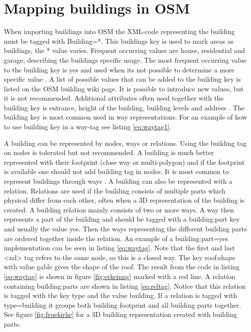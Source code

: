  \section{Mapping buildings in OSM}\label{buildOSM}
When importing buildings into OSM the XML-code representing the building must be tagged with Building=*. This buildings key is used to mark areas as buildings, the * value varies. Frequent occurring values are house, residential and garage, describing the buildings specific usage. The most frequent occurring value to the building key is yes and used when its not possible to determine a more specific value \cite{OpenStreetMapf}. A list of possible values that can be added to the building key is listed on the OSM building wiki page. It is possible to introduce new values, but it is not recommended. Additional attributes often used together with the building key is entrance, height of the building, building levels and address \cite{Unkn} . The building key is most common used in way representations. For an example of how to use building key in a way-tag see listing \ref{eq:waytag1}.

A building can be represented by nodes, ways or relations. Using the building tag on nodes is tolerated but not recommended. A building is much better represented with their footprint (close way or multi-polygon) and if the footprint is available one should not add building tag in nodes. It is most common to represent buildings through ways \cite{OpenStreetMapf}. A building can also be represented with a relation. Relations are used if the building consists of multiple parts which physical differ from each other, often when a 3D representation of the building is created. A building relation mainly consists of two or more ways. A way then represents a part of the building and should be tagged with a building:part key and usually the value yes. Then the ways representing the different building parts are ordered together inside the relation. An example of a building:part=yes implementation can be seen in listing \ref{eq:waytag}. Note that the first and last <nd> tag refers to the same node, so this is a closed way. The key roof:shape with value gable gives the shape of the roof. The result from the code in listing \ref{eq:waytag} is shown in figure \ref{fig:erkeinng} marked with a red line. A relation containing building:parts are shown in listing \ref{eq:reltag}. Notice that this relation is tagged with the key type and the value building. If a relation is tagged with type=building it groups both building footprint and all building parts together. See figure \ref{fig:fruekirke} for a 3D building representation created with building parts. 

